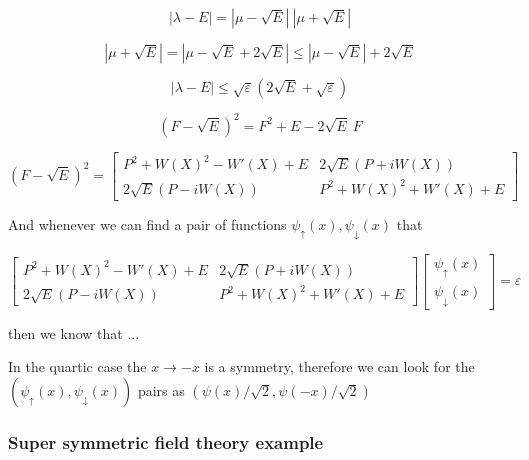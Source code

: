 \documentclass{article}
\theoremstyle{definition}
\begin{document}
\begin{equation}
    |\lambda - E| = |\mu-\sqrt{E}| \  | \mu + \sqrt{E}|
\end{equation}

\begin{equation}
    | \mu + \sqrt{E}| = | \mu - \sqrt{E} + 2 \sqrt{E}| \le | \mu - \sqrt{E}| + 2 \sqrt{E}
\end{equation}

\begin{equation}
    |\lambda - E| \le \sqrt{\varepsilon} (2 \sqrt{E} + \sqrt{\varepsilon})
\end{equation}

\begin{equation}
    (F-\sqrt{E})^2 = F^2 + E - 2 \sqrt{E} \  F
\end{equation}

\begin{equation}
    (F-\sqrt{E})^2 =
    \begin{bmatrix}
        P^2 + W(X)^2 - W'(X) + E & 2 \sqrt{E} (P+i W(X)) \\
        2 \sqrt{E} (P-i W(X)) & P^2 + W(X)^2 + W'(X) + E
    \end{bmatrix}
\end{equation}

And whenever we can find a pair of functions $\psi_\uparrow(x),\psi_\downarrow(x)$ that 

\begin{equation}
    [\psi_\uparrow^*(x),\psi_\downarrow^*(x)] 
    \begin{bmatrix}
        P^2 + W(X)^2 - W'(X) + E & 2 \sqrt{E} (P+i W(X)) \\
        2 \sqrt{E} (P-i W(X)) & P^2 + W(X)^2 + W'(X) + E
    \end{bmatrix}
    \begin{bmatrix}
        \psi_\uparrow(x) \\
        \psi_\downarrow(x)
    \end{bmatrix}
    =
    \varepsilon
\end{equation}

then we know that ...

In the quartic case the $x \to -x$ is a symmetry, therefore we can look for the $(\psi_\uparrow(x),\psi_\downarrow(x))$ pairs as $(\psi(x)/\sqrt{2},\psi(-x)/\sqrt{2})$

\subsubsection{Super symmetric field theory example}
\end{document}
